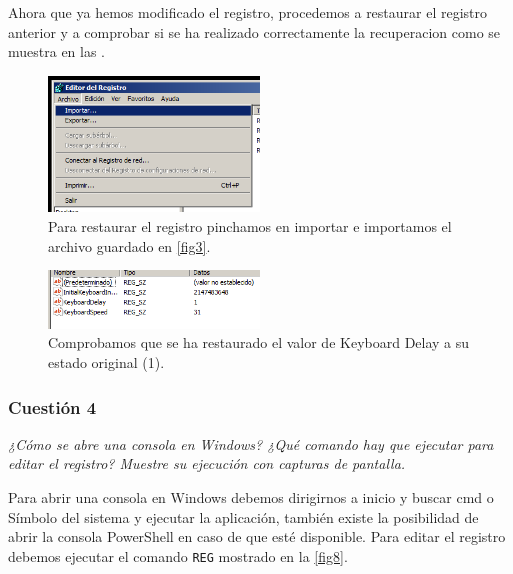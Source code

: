 Ahora que ya hemos modificado el registro, procedemos a restaurar el registro anterior y a comprobar si se ha realizado correctamente la recuperacion como se muestra en las .
\begin{figure}[H]
  \begin{center}
    \includegraphics[width=0.5\textwidth]{imagenes/6}
    \caption{Para restaurar el registro pinchamos en importar e importamos el archivo guardado en \ref{fig3}.}
    \label{fig6}
  \end{center}
\end{figure}

\begin{figure}[H]
  \begin{center}
    \includegraphics[width=0.5\textwidth]{imagenes/7}
    \caption{Comprobamos que se ha restaurado el valor de Keyboard Delay a su estado original (1).}
    \label{fig7}
  \end{center}
\end{figure}



\subsubsection{Cuestión 4}
\textit{¿Cómo se abre una consola en Windows? ¿Qué comando hay que ejecutar para editar el registro? Muestre su ejecución con capturas de pantalla.}
\newline

Para abrir una consola en Windows debemos dirigirnos a inicio y buscar cmd o Símbolo del sistema y ejecutar la aplicación, también existe la posibilidad de abrir la consola PowerShell en caso de que esté disponible.\cite{cmd} Para editar el registro debemos ejecutar el comando \texttt{REG} \cite{reg1}\cite{reg2} mostrado en la \cref{fig8}.

